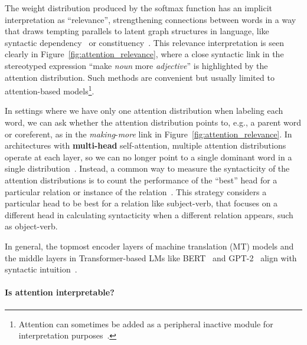 The weight distribution produced by the softmax function has an implicit interpretation as ``relevance'', strengthening connections between words in a way that draws tempting parallels to latent graph structures in language, like syntactic dependency~\citep{clark_what_2019,voita_analyzing_2019,htut_attention_2019} or constituency~\citep{marecek_balustrades_2019}. This relevance interpretation is seen clearly in Figure~\ref{fig:attention_relevance}, where a close syntactic link in the stereotyped expression ``make \textit{noun} more \textit{adjective}'' is highlighted by the attention distribution. Such methods are convenient but usually limited to attention-based models\footnote{Attention can sometimes be added as a peripheral inactive module for interpretation purposes~\citep{godard_unsupervised_2018}.}.

In settings where we have only one attention distribution when labeling each word, we can ask whether the attention distribution points to, e.g., a parent word or coreferent, as in the \textit{making}-\textit{more} link in Figure~\ref{fig:attention_relevance}. In architectures with \textbf{multi-head} self-attention, multiple attention distributions operate at each layer, so we can no longer point to a single dominant word in a single distribution~\citep{limisiewicz_syntax_2020}. Instead, a common way to measure the syntacticity of the attention distributions is to count the performance of the ``best'' head for a particular relation or instance of the relation~\citep{voita_analyzing_2019,clark_what_2019}. This strategy considers a particular head to be best for a relation like subject-verb, that focuses on a different head in calculating syntacticity when a different relation appears, such as object-verb.

In general, the topmost encoder layers of machine translation (MT) models and the middle layers in Transformer-based LMs like BERT~\citep{Devlin2019BERTPO} and GPT-2~\citep{Radford2019LanguageMA} align with syntactic intuition~\citep{limisiewicz_syntax_2020}.

\paragraph{Is attention interpretable?}

